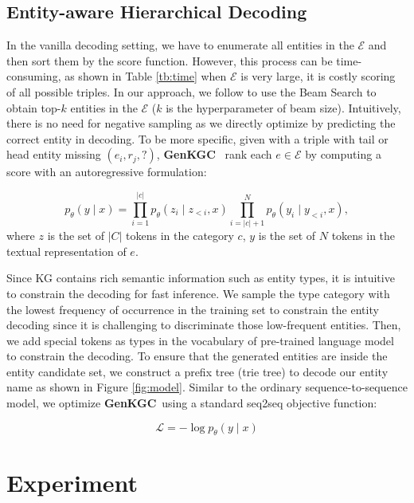 \documentclass[sigconf]{acmart}
\newcommand{\ours}{\textbf{GenKGC}}
\begin{document}
\subsection{Entity-aware Hierarchical Decoding}



In the vanilla decoding setting, we have to enumerate all entities in the $\mathcal{E}$ and then sort them by the score function.
However, this process can be time-consuming, as shown in  Table \ref{tb:time} when $\mathcal{E}$ is very large, it is costly scoring of all possible triples.
In our approach, we follow  \cite{DBLP:conf/iclr/CaoI0P21} to use the Beam Search to obtain top-$k$ entities in the $\mathcal{E}$ ($k$ is the hyperparameter of beam size).
Intuitively, there is no need for negative sampling as we directly optimize by predicting the correct entity in decoding.
To be more specific, given with a triple with tail or head entity missing $(e_i,r_j,?)$, \ours~  rank each $e \in \mathcal{E}$ by computing a score with an autoregressive formulation:

\begin{equation}
p_{\theta}(y \mid x)=\prod_{i=1}^{|c|} p_{\theta}\left(z_{i} \mid z_{<i}, x\right)  \prod_{i=|c|+1}^{N} p_{\theta}\left(y_{i} \mid y_{<i}, x\right) ,
\end{equation}
where $z$ is the set of $|C|$ tokens in the category $c$, $y$ is the set of $N$ tokens in the textual representation of $e$. 



Since KG contains rich semantic information such as entity types, it is intuitive to constrain the decoding for fast inference.
We sample the type category with the lowest frequency of occurrence in the training set to constrain the entity decoding since it is challenging to discriminate those low-frequent entities.
Then, we add special tokens as types in the  vocabulary of pre-trained language model to constrain the decoding. 
To ensure that the generated entities are inside the entity candidate set, we construct a prefix tree (trie tree) to decode our entity name as shown in Figure \ref{fig:model}.
Similar to the ordinary sequence-to-sequence model, we optimize \ours~using a standard seq2seq objective function:

\begin{equation}
\mathcal{L} = - \log p_{\theta}(y \mid x)
\end{equation}


\section{Experiment}
\end{document}
